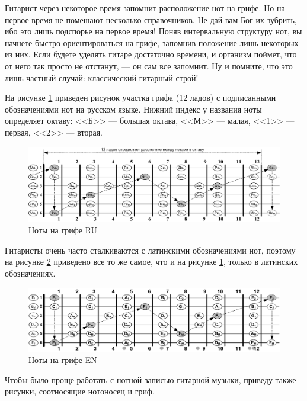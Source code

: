Гитарист через некоторое время запомнит расположение нот на грифе. Но на первое время не помешают несколько справочников. Не дай вам Бог их зубрить, ибо это лишь подспорье на первое время! Поняв интервальную структуру нот, вы начнете быстро ориентироваться на грифе, запомнив положение лишь некоторых из них. Если будете уделять гитаре достаточно времени, и организм поймет, что от него так просто не отстанут, --- он сам все запомнит. Ну и помните, что это лишь частный случай: классический гитарный строй!

На рисунке \ref{fig:guitar:notes-on-griph-ru} приведен рисунок участка грифа (12 ладов) с подписанными обозначениями нот на русском языке. Нижний индекс у названия ноты определяет октаву: <<Б>> --- большая октава, <<М>> --- малая, <<1>> --- первая, <<2>> --- вторая.

\begin{figure}[!ht]
    \centering
    \includegraphics[width=\textwidth]{fig/notes-on-griph-ru} 
    \caption{Ноты на грифе RU}\label{fig:guitar:notes-on-griph-ru}
\end{figure} 

Гитаристы очень часто сталкиваются с латинскими обозначениями нот, поэтому на рисунке \ref{fig:guitar:notes-on-griph-lat} приведено все то же самое, что и на рисунке \ref{fig:guitar:notes-on-griph-ru}, только в латинских обозначениях.

\begin{figure}[!ht]
    \centering
    \includegraphics[width=\textwidth]{fig/notes-on-griph-lat} 
    \caption{Ноты на грифе EN}\label{fig:guitar:notes-on-griph-lat}
\end{figure} 

Чтобы было проще работать с нотной записью гитарной музыки, приведу также рисунки, соотносящие нотоносец и гриф.

